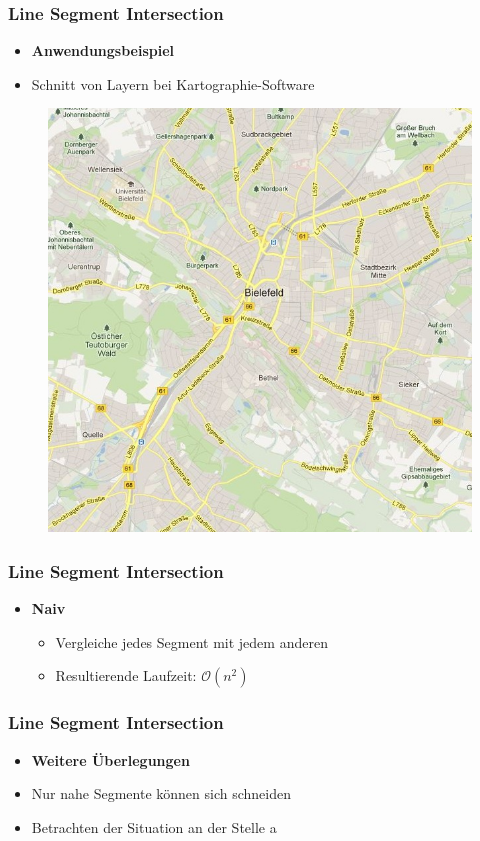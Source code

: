 \begin{frame}
	\frametitle{{Line Segment Intersection}}
	\begin{itemize}
		\item \textbf{Anwendungsbeispiel}
		\item Schnitt von Layern bei Kartographie-Software
	\end{itemize}
	\begin{figure}
  		\begin{center}
   			\includegraphics[scale=0.30]{bilder/map.jpg}
 		\end{center}
	\end{figure}
\end{frame}
\begin{frame}
	\frametitle{{Line Segment Intersection}}
	\begin{itemize}
		\item \textbf{Naiv}
		\begin{itemize}
			\pause
			\item{Vergleiche jedes Segment mit jedem anderen}
			\pause
			\item{Resultierende Laufzeit: $\mathcal O(n^2)$}
		\end{itemize}
	\end{itemize}
\end{frame}
\begin{frame}
	\frametitle{{Line Segment Intersection}}
	\begin{itemize}
		\item \textbf{Weitere \"Uberlegungen}
		\pause
		\item{Nur nahe Segmente k\"onnen sich schneiden}
		\pause
		\item{Betrachten der Situation an der Stelle a}
	\end{itemize}
\end{frame}
